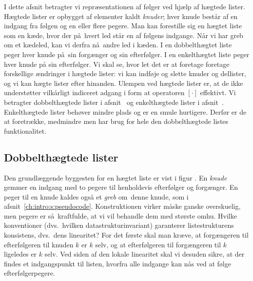 I dette afsnit betragter vi repræsentationen af følger ved hjælp af hægtede lister.
Hægtede lister er opbygget af elementer kaldt \emph{knuder};
hver knude består af en indgang fra følgen og en eller flere pegere.
Man kan forestille sig en hægtet liste som en kæde, hvor der på hvert led står en af følgens indgange.
Når vi har greb om et kædeled, kan vi derfra nå andre led i kæden.
I en dobbelthægtet liste peger hver knude på sin forgænger og sin efterfølger.
I en enkelthægtet liste peger hver knude på sin efterfølger.
Vi skal se, hvor let det er at foretage foretage forskellige ændringer i hægtede lister:
vi kan indføje og slette knuder og dellister, og vi kan hægte lister efter hinanden.
Ulempen ved hægtede lister er, at de ikke understøtter vilkårligt indiceret adgang i form at operatoren $[\cdot]$ effektivt.
Vi betragter dobbelthægtede lister i afsnit~ og enkelthægtede lister i afsnit~.
Enkelthægtede lister behøver mindre plads og er en smule hurtigere.
Derfør er de at  foretrække, medmindre men har brug for hele den dobbelthægtede listes funktionalitet.

\subsection{Dobbelthægtede lister}

Den grundlæggende byggesten for en hægtet liste er vist i figur .
En \emph{knude}%
gemmer en indgang med to pegere til henholdsvis efterfølger og forgænger.
En peger til en knude kaldes også et \emph{greb}
om denne knude, som i afsnit~\ref{ch:intro:s:pseudocode}.
Konstruktionen virker måske ganske overskuelig, men pegere er så kraftfulde, at vi vil behandle dem med største omhu.
Hvilke konventioner (dvs.\ hvilken datastruktur\-invariant) garanterer listestrukturens konsistens, dvs.\ dens linearitet?
For det første skal man kræve, at forgængeren til efterfølgeren til knuden $k$ er $k$ selv, og at efterfølgeren til forgængeren til $k$ ligeledes er $k$ selv.
Ved siden af den lokale linearitet skal vi desuden sikre, at der findes et indgangspunkt til listen, hvorfra alle indgange kan nås ved at følge efterfølgerpegere.

